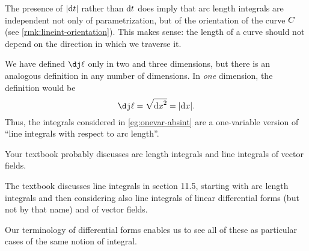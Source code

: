 \documentclass[12pt]{amsart}
\begin{document}
\begin{rmk}
  The presence of $|{\mathrm{d} t}|$ rather than ${\mathrm{d} t}$ does imply that arc length integrals are independent not only of parametrization, but of the orientation of the curve $C$ (see \cref{rmk:lineint-orientation}).
  This makes sense: the length of a curve should not depend on the direction in which we traverse it.
\end{rmk}

\begin{rmk}
  We have defined $\dl$ only in two and three dimensions, but there is an analogous definition in any number of dimensions.
  In \emph{one} dimension, the definition would be
  \[ \dl = \sqrt{\dx^2} = |\dx|. \]
  Thus, the integrals considered in \cref{eg:onevar-absint} are a one-variable version of ``line integrals with respect to arc length''.
\end{rmk}

\begin{notextbook}Your textbook probably discusses arc length integrals and line integrals of vector fields.\end{notextbook}
\begin{stewart}The textbook discusses line integrals in section 11.5, starting with arc length integrals and then considering also line integrals of linear differential forms (but not by that name) and of vector fields.\end{stewart}
Our terminology of differential forms enables us to see all of these as particular cases of the same notion of integral.
\end{document}
